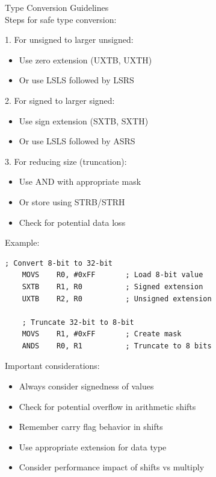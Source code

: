 \begin{KR}{Type Conversion Guidelines}\\
Steps for safe type conversion:

1. For unsigned to larger unsigned:
\begin{itemize}
  \item Use zero extension (UXTB, UXTH)
  \item Or use LSLS followed by LSRS
\end{itemize}

2. For signed to larger signed:
\begin{itemize}
  \item Use sign extension (SXTB, SXTH)
  \item Or use LSLS followed by ASRS
\end{itemize}

3. For reducing size (truncation):
\begin{itemize}
  \item Use AND with appropriate mask
  \item Or store using STRB/STRH
  \item Check for potential data loss
\end{itemize}

Example:
\begin{lstlisting}[language=armasm, style=base]
    ; Convert 8-bit to 32-bit
    MOVS    R0, #0xFF       ; Load 8-bit value
    SXTB    R1, R0          ; Signed extension
    UXTB    R2, R0          ; Unsigned extension
    
    ; Truncate 32-bit to 8-bit
    MOVS    R1, #0xFF       ; Create mask
    ANDS    R0, R1          ; Truncate to 8 bits
\end{lstlisting}
\end{KR}

\begin{remark}
Important considerations:
\begin{itemize}
  \item Always consider signedness of values
  \item Check for potential overflow in arithmetic shifts
  \item Remember carry flag behavior in shifts
  \item Use appropriate extension for data type
  \item Consider performance impact of shifts vs multiply
\end{itemize}
\end{remark}